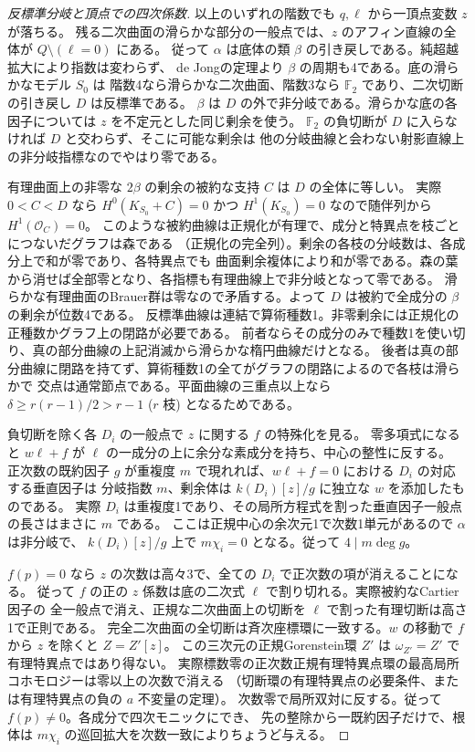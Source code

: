 \begin{proof}[反標準分岐と頂点での四次係数]
以上のいずれの階数でも $q,\ell$ から一頂点変数 $z$ が落ちる。
残る二次曲面の滑らかな部分の一般点では、$z$ のアフィン直線の全体が $Q\setminus(\ell=0)$ にある。
従って $\alpha$ は底体の類 $\beta$ の引き戻しである。純超越拡大により指数は変わらず、
de Jongの定理より $\beta$ の周期も4である。底の滑らかなモデル $S_0$ は
階数4なら滑らかな二次曲面、階数3なら $\mathbb F_2$ であり、二次切断の引き戻し $D$ は反標準である。
$\beta$ は $D$ の外で非分岐である。滑らかな底の各因子については $z$ を不定元とした同じ剰余を使う。
$\mathbb F_2$ の負切断が $D$ に入らなければ $D$ と交わらず、そこに可能な剰余は
他の分岐曲線と会わない射影直線上の非分岐指標なのでやはり零である。

有理曲面上の非零な $2\beta$ の剰余の被約な支持 $C$ は $D$ の全体に等しい。
実際 $0<C<D$ なら $H^0(K_{S_0}+C)=0$ かつ $H^1(K_{S_0})=0$ なので随伴列から $H^1(\mathcal O_C)=0$。
このような被約曲線は正規化が有理で、成分と特異点を枝ごとにつないだグラフは森である
（正規化の完全列）。剰余の各枝の分岐数は、各成分上で和が零であり、各特異点でも
曲面剰余複体により和が零である。森の葉から消せば全部零となり、各指標も有理曲線上で非分岐となって零である。
滑らかな有理曲面のBrauer群は零なので矛盾する。よって $D$ は被約で全成分の $\beta$ の剰余が位数4である。
反標準曲線は連結で算術種数1。非零剰余には正規化の正種数かグラフ上の閉路が必要である。
前者ならその成分のみで種数1を使い切り、真の部分曲線の上記消滅から滑らかな楕円曲線だけとなる。
後者は真の部分曲線に閉路を持てず、算術種数1の全てがグラフの閉路によるので各枝は滑らかで
交点は通常節点である。平面曲線の三重点以上なら $\delta\ge r(r-1)/2>r-1$ ($r$ 枝) となるためである。

負切断を除く各 $D_i$ の一般点で $z$ に関する $f$ の特殊化を見る。
零多項式になると $w\ell+f$ が $\ell$ の一成分の上に余分な素成分を持ち、中心の整性に反する。
正次数の既約因子 $g$ が重複度 $m$ で現れれば、$w\ell+f=0$ における $D_i$ の対応する垂直因子は
分岐指数 $m$、剰余体は $k(D_i)[z]/g$ に独立な $w$ を添加したものである。
実際 $D_i$ は重複度1であり、その局所方程式を割った垂直因子一般点の長さはまさに $m$ である。
ここは正規中心の余次元1で次数1単元があるので $\alpha$ は非分岐で、
$k(D_i)[z]/g$ 上で $m\chi_i=0$ となる。従って $4\mid m\deg g$。

$f(p)=0$ なら $z$ の次数は高々3で、全ての $D_i$ で正次数の項が消えることになる。
従って $f$ の正の $z$ 係数は底の二次式 $\ell$ で割り切れる。実際被約なCartier因子の
全一般点で消え、正規な二次曲面上の切断を $\ell$ で割った有理切断は高さ1で正則である。
完全二次曲面の全切断は斉次座標環に一致する。$w$ の移動で $f$ から $z$ を除くと $Z=Z'[z]$。
この三次元の正規Gorenstein環 $Z'$ は $\omega_{Z'}=Z'$ で有理特異点ではあり得ない。
実際標数零の正次数正規有理特異点環の最高局所コホモロジーは零以上の次数で消える
（切断環の有理特異点の必要条件、または有理特異点の負の $a$ 不変量の定理）。
次数零で局所双対に反する。従って $f(p)\ne0$。各成分で四次モニックにでき、
先の整除から一既約因子だけで、根体は $m\chi_i$ の巡回拡大を次数一致によりちょうど与える。


\end{proof}

